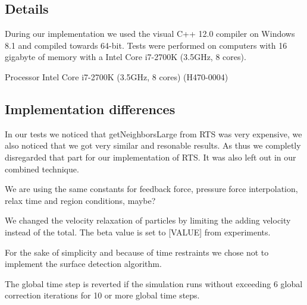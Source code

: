 \documentclass[../../main.tex]{subfiles}
\begin{document}

\subsection{Details}
During our implementation we used the visual C++ 12.0 compiler on Windows 8.1 and compiled towards 64-bit. Tests were performed on computers with 16 gigabyte of memory with a Intel Core i7-2700K (3.5GHz, 8 cores).

Processor Intel Core i7-2700K (3.5GHz, 8 cores) (H470-0004)

\subsection{Implementation differences}
In our tests we noticed that getNeighborsLarge from RTS was very expensive, we also noticed that we got very similar and resonable results. As thus we completly disregarded that part for our implementation of RTS. It was also left out in our combined technique. %


We are using the same constants for feedback force, pressure force interpolation, relax time and region conditions, maybe? 


We changed the velocity relaxation of particles by limiting the adding velocity instead of the total. The beta value is set to [VALUE] from experiments. 

For the sake of simplicity and because of time restraints we chose not to implement the surface detection algorithm.

The global time step is reverted if the simulation runs without exceeding 6 global correction iterations for 10 or more global time steps. 
\end{document}
